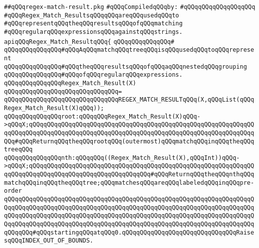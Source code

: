 \label{src/lib/regex/glue/regex-match-result.pkg}
\verb|##qQQqregex-match-result.pkg|\newline
\newline
\verb|#qQQqCompiledqQQqby:|\newline
\verb|#qQQqqQQqqQQqqQQqqQQq|\newline
\newline
\verb|#qQQqRegex_Match_ResultsqQQqqQQqareqQQqusedqQQqto|\newline
\verb|#qQQqrepresentqQQqtheqQQqresultsqQQqofqQQqmatching|\newline
\verb|#qQQqregularqQQqexpressionsqQQqagainstqQQqstrings.|\newline
\newline
\newline
\newline
\verb|apiqQQqRegex_Match_ResultqQQq{|\newline
\verb|qQQqqQQqqQQqqQQq#|\newline
\verb|qQQqqQQqqQQqqQQq#qQQqAqQQqmatchqQQqtreeqQQqisqQQqusedqQQqtoqQQqrepresent|\newline
\verb|qQQqqQQqqQQqqQQq#qQQqtheqQQqresultsqQQqofqQQqaqQQqnestedqQQqgrouping|\newline
\verb|qQQqqQQqqQQqqQQq#qQQqofqQQqregularqQQqexpressions.|\newline
\newline
\verb|qQQqqQQqqQQqqQQqRegex_Match_Result(X)|\newline
\verb|qQQqqQQqqQQqqQQqqQQqqQQqqQQqqQQq=|\newline
\verb|qQQqqQQqqQQqqQQqqQQqqQQqqQQqqQQqREGEX_MATCH_RESULTqQQq(X,qQQqList(qQQqRegex_Match_Result(X)qQQq));|\newline
\newline
\verb|qQQqqQQqqQQqqQQqroot:qQQqqQQqRegex_Match_Result(X)qQQq->qQQqX;qQQqqQQqqQQqqQQqqQQqqQQqqQQqqQQqqQQqqQQqqQQqqQQqqQQqqQQqqQQqqQQqqQQqqQQqqQQqqQQqqQQqqQQqqQQqqQQqqQQqqQQqqQQqqQQqqQQqqQQqqQQqqQQqqQQqqQQq#qQQqReturnqQQqtheqQQqrootqQQq(outermost)qQQqmatchqQQqinqQQqtheqQQqtreeqQQq|\newline
\newline
\verb|qQQqqQQqqQQqqQQqnth:qQQqqQQq((Regex_Match_Result(X),qQQqInt))qQQq->qQQqX;qQQqqQQqqQQqqQQqqQQqqQQqqQQqqQQqqQQqqQQqqQQqqQQqqQQqqQQqqQQqqQQqqQQqqQQqqQQqqQQqqQQqqQQqqQQqqQQqqQQqqQQq#qQQqReturnqQQqtheqQQqnthqQQqmatchqQQqinqQQqtheqQQqtree;qQQqmatchesqQQqareqQQqlabeledqQQqinqQQqpre-order|\newline
\verb|qQQqqQQqqQQqqQQqqQQqqQQqqQQqqQQqqQQqqQQqqQQqqQQqqQQqqQQqqQQqqQQqqQQqqQQqqQQqqQQqqQQqqQQqqQQqqQQqqQQqqQQqqQQqqQQqqQQqqQQqqQQqqQQqqQQqqQQqqQQqqQQqqQQqqQQqqQQqqQQqqQQqqQQqqQQqqQQqqQQqqQQqqQQqqQQqqQQqqQQqqQQqqQQqqQQqqQQqqQQqqQQqqQQqqQQqqQQqqQQqqQQqqQQqqQQqqQQqqQQqqQQqqQQqqQQqqQQqqQQqqQQqqQQq#qQQqstartingqQQqatqQQq0.qQQqqQQqqQQqqQQqqQQqqQQqqQQqqQQqRaisesqQQqINDEX_OUT_OF_BOUNDS.|\newline
